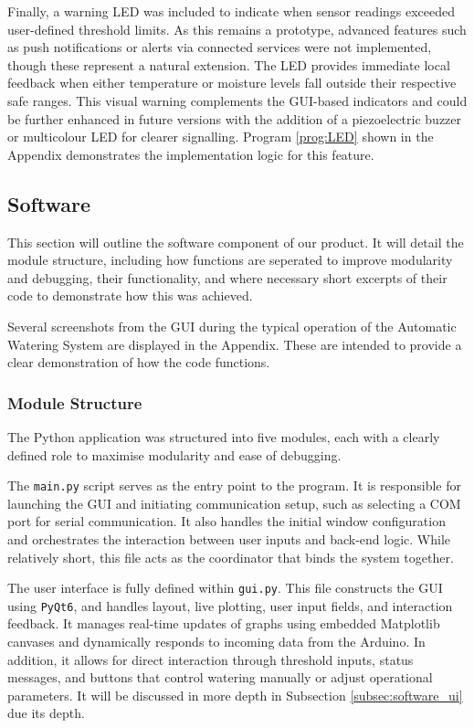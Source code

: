 \documentclass[a4paper,11pt]{article}
\begin{document}
Finally, a warning LED was included to indicate when sensor readings 
exceeded user-defined threshold limits. 
As this remains a prototype, advanced features such as push notifications 
or alerts via connected services were not implemented, 
though these represent a natural extension. 
The LED provides immediate local feedback when either temperature or moisture 
levels fall outside their respective safe ranges. 
This visual warning complements the GUI-based indicators and could be further enhanced 
in future versions with the addition of a piezoelectric buzzer 
or multicolour LED for clearer signalling. 
Program \ref{prog:LED} shown in the Appendix demonstrates 
the implementation logic for this feature.

\subsection{Software}
\label{sec:software}

This section will outline the software component of our product.
It will detail the module structure,
including how functions are seperated to improve modularity and debugging,
their functionality,
and where necessary short excerpts of their code to demonstrate how this was achieved.

Several screenshots from the GUI during the typical operation
of the Automatic Watering System are displayed in the Appendix.
These are intended to provide a clear demonstration of how the code functions.

\subsubsection{Module Structure}
\label{subsec:software_modules}
The Python application was structured into five modules, 
each with a clearly defined role to maximise modularity and ease of debugging.

The \texttt{main.py} script serves as the entry point to the program. 
It is responsible for launching the GUI and initiating communication setup, 
such as selecting a COM port for serial communication. 
It also handles the initial window configuration and orchestrates the interaction 
between user inputs and back-end logic. 
While relatively short, this file acts as the coordinator that binds the system together.

The user interface is fully defined within \texttt{gui.py}. 
This file constructs the GUI using \texttt{PyQt6}, 
and handles layout, live plotting, user input fields, and interaction feedback. 
It manages real-time updates of graphs using embedded Matplotlib canvases 
and dynamically responds to incoming data from the Arduino. 
In addition, it allows for direct interaction through threshold inputs, 
status messages, and buttons that control watering manually or adjust operational parameters.
It will be discussed in more depth in Subsection \ref{subsec:software_ui} due its depth.
\end{document}
